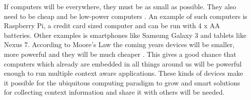 If computers will be everywhere, they must be as small as possible. They also need to be cheap and be low-power computers \cite{datainspect}. An example of such computers is Raspberry Pi, a credit card sized computer and can be run with 4 x AA batteries. Other examples is smartphones like Samsung Galaxy 3 and tablets like Nexus 7. According to Moore's Law the coming years devices will be smaller, more powerful and they will be much cheaper \cite{591665}. This gives a good chance that computers which already are embedded in all things around us will be powerful enough to run multiple context aware applications. These kinds of devices make it possible for the ubiquitous computing paradigm to grow and smart solutions for collecting context information and share it with others will be needed.
